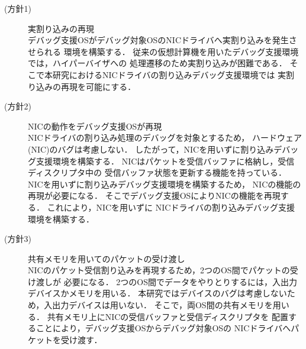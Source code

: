 \documentclass[tanilab-enum]{graduate}
\begin{document}
\begin{description}
    \item[(方針1)]実割り込みの再現\\
        デバッグ支援OSがデバッグ対象OSのNICドライバへ実割り込みを発生させられる
        環境を構築する．
        従来の仮想計算機を用いたデバッグ支援環境では，ハイパーバイザへの
        処理遷移のため実割り込みが困難である．
        そこで本研究におけるNICドライバの割り込みデバッグ支援環境では
        実割り込みの再現を可能にする．

    \item[(方針2)]NICの動作をデバッグ支援OSが再現\\
        NICドライバの割り込み処理のデバッグを対象とするため，
        ハードウェア(NIC)のバグは考慮しない．
        したがって，NICを用いずに割り込みデバッグ支援環境を構築する．
        NICはパケットを受信バッファに格納し，受信ディスクリプタ中の
        受信バッファ状態を更新する機能を持っている．
        NICを用いずに割り込みデバッグ支援環境を構築するため，
        NICの機能の再現が必要になる．
        そこでデバッグ支援OSによりNICの機能を再現する．
        これにより，NICを用いずに
        NICドライバの割り込みデバッグ支援環境を構築する．

    \item[(方針3)]共有メモリを用いてのパケットの受け渡し\\
        NICのパケット受信割り込みを再現するため，2つのOS間でパケットの受け渡しが
        必要になる．
        2つのOS間でデータをやりとりするには，入出力デバイスかメモリを用いる．
        本研究ではデバイスのバグは考慮しないため，入出力デバイスは用いない．
        そこで，両OS間の共有メモリを用いる．
        共有メモリ上にNICの受信バッファと受信ディスクリプタを
        配置することにより，デバッグ支援OSからデバッグ対象OSの
        NICドライバへパケットを受け渡す．

\end{description}
\end{document}
